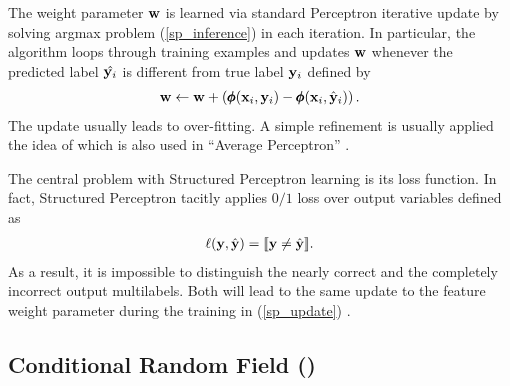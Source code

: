 {The weight parameter $\vw$ is learned via standard Perceptron iterative update by solving argmax problem (\ref{sp_inference}) in each iteration.
In particular, the algorithm loops through training examples and updates $\vw$ whenever the predicted label $\hat{\mathbf {y}_i}$ is different from true label $\mathbf {y}_i$ defined by
\begin{align}
	\mathbf {w} \leftarrow \mathbf {w} + \left(\pmb \phi(\mathbf {x}_i,\mathbf {y}_i) - \pmb \phi(\mathbf {x}_i,\hat{\mathbf {y}}_i)\right). \label{sp_update}
\end{align}
The update usually leads to over-fitting.
A simple refinement is usually applied the idea of which is also used in ``Average Perceptron'' \citep{Freund99large}.

\iffalse
The update usually leads to over-fitting and a simple refinement, called "average parameter" similar to \citep{Freund99large}, is shown in (Algorithm~\ref{algorithm_structured_perceptron}).
\begin{algorithm}
\caption{Structured Perceptron with Parameter Averaging}
\label{algorithm_structured_perceptron}
\begin{algorithmic}[1]
	\REQUIRE Training sample $\lbrace (\vx_i,\vy_i)\rbrace_{i=1}^m$
	\ENSURE Weight parameter $\vw$
	\STATE $\vw^{t,i}=[0,\cdots,0],\,\forall t\in\{1,\cdots,T\},\,\forall i\in\{1,\cdots,m\}$
	\FOR{$t=1\cdots T$}
		\FOR{$i=1\cdots m$}
			\STATE $\hat{\vy} = \underset{\vy\in\vYcal}{\argmax} \quad \ip{\vw^{t-1,i-1}}{\phib(\vx_i,\vy)}$
			\IF{$\hat{\vy}\neq\vy$}
				\STATE $\vw^{t,i} = \vw^{t-1,i-1} + \phib(\vx_i,\vy_i) - \phib(\vx_i,\hat{\vy}_i)$
			\ENDIF
		\ENDFOR
	\ENDFOR
	\RETURN $\vw = \frac{1}{Tm}\sum_{t=1}^{T}\sum_{i=1}^{m}\vw^{t,i}$
\end{algorithmic}
\end{algorithm}
\fi

The central problem with Structured Perceptron learning is its loss function.
In fact, Structured Perceptron tacitly applies $0/1$ loss over output variables defined as
\begin{align*}
	\mathbf {\ell}(\mathbf {y},\hat{\mathbf {y}})={\llbracket \mathbf {y}\neq\hat{\mathbf {y}} \rrbracket}.
\end{align*}
As a result, it is impossible to distinguish the nearly correct and the completely incorrect output multilabels.
Both will lead to the same update to the feature weight parameter during the training in (\ref{sp_update}) .



%
% 
\subsection{Conditional Random Field (\crf)} \label{sc_crf}

}
